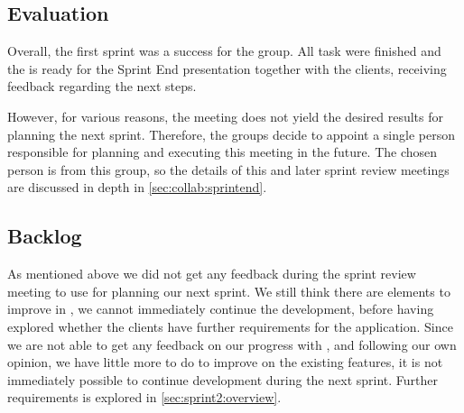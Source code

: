 \subsection{Evaluation}
Overall, the first sprint was a success for the group.
All task were finished and the \launcher is ready for the Sprint End presentation together with the clients, receiving feedback regarding the next steps.

However, for various reasons, the meeting does not yield the desired results for planning the next sprint.
Therefore, the groups decide to appoint a single person responsible for planning and executing this meeting in the future.
The chosen person is from this group, so the details of this and later sprint review meetings are discussed in depth in \cref{sec:collab:sprintend}.

\subsection{Backlog}
As mentioned above we did not get any feedback during the sprint review meeting to use for planning our next sprint.
We still think there are elements to improve in \launcher, we cannot immediately continue the development, before having explored whether the clients have further requirements for the application.
Since we are not able to get any feedback on our progress with \launcher, and following our own opinion, we have little more to do to improve on the existing features, it is not immediately possible to continue development during the next sprint. Further requirements is explored in \cref{sec:sprint2:overview}.